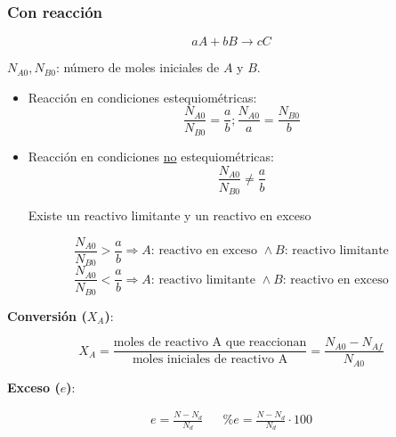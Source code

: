         \subsubsection{Con reacción}
        
            
            \[a A + b B \rightarrow c C\]
            
            \(N_{A0}, N_{B0}\): número de moles iniciales de \(A\) y \(B\).
            
            \begin{itemize}
                \item Reacción en condiciones estequiométricas:
                \[\frac{N_{A0}}{N_{B0}} = \frac{a}{b}; \frac{N_{A0}}{a} = \frac{N_{B0}}{b}\]
                
                \item Reacción en condiciones \underline{no} estequiométricas:
                \[\frac{N_{A0}}{N_{B0}} \neq \frac{a}{b}\]
                
                Existe un reactivo limitante y un reactivo en exceso
            \end{itemize}
            
            \[\frac{N_{A0}}{N_{B0}} > \frac{a}{b} \Rightarrow A \text{: reactivo en exceso } \wedge B \text{: reactivo limitante}\]
            \[\frac{N_{A0}}{N_{B0}} < \frac{a}{b} \Rightarrow A \text{: reactivo limitante } \wedge B \text{: reactivo en exceso}\]
            
            
            \textbf{Conversión (\(X_{A}\))}:
            
            \begin{quote}
                \textit{}
            \end{quote}
            
            \[X_{A} = \frac{\text{moles de reactivo A que reaccionan}}{\text{moles iniciales de reactivo A}} = \frac{N_{A0} - N_{Af}}{N_{A0}}\]
            
            \textbf{Exceso (\(e\))}:
            
            \begin{equation}
             \label{eq:exceso}
                \begin{matrix}
                    e = \frac{N - N_{d}}{N_{d}} &  & \% e = \frac{N - N_{d}}{N_{d}} \cdot 100
                \end{matrix}
            \end{equation}
            
